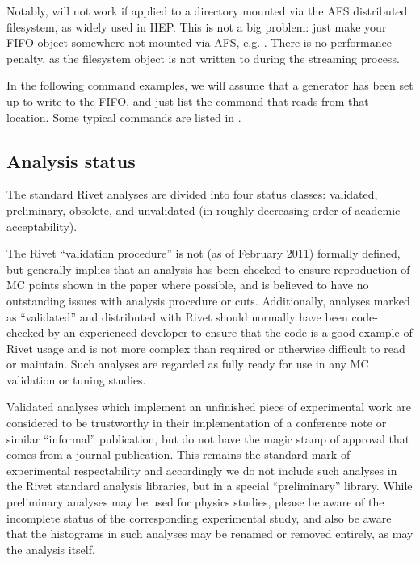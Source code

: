 \documentclass{JHEP3}
\begin{document}
Notably,  will not work if applied to a directory mounted via the
AFS distributed filesystem, as widely used in HEP. This is not a big problem:
just make your FIFO object somewhere not mounted via AFS, e.g. . There
is no performance penalty, as the filesystem object is not written to during the
streaming process.

In the following command examples, we will assume that a generator has been set
up to write to the  FIFO, and just list the  command
that reads from that location. Some typical  commands are
listed in .


\subsection{Analysis status}

The standard Rivet analyses are divided into four status classes: validated,
preliminary, obsolete, and unvalidated (in roughly decreasing order of academic
acceptability).

The Rivet ``validation procedure'' is not (as of February 2011) formally
defined, but generally implies that an analysis has been checked to ensure
reproduction of MC points shown in the paper where possible, and is believed to
have no outstanding issues with analysis procedure or cuts.  Additionally,
analyses marked as ``validated'' and distributed with Rivet should normally have
been code-checked by an experienced developer to ensure that the code is a good
example of Rivet usage and is not more complex than required or otherwise
difficult to read or maintain. Such analyses are regarded as fully ready for use
in any MC validation or tuning studies.

Validated analyses which implement an unfinished piece of experimental work are
considered to be trustworthy in their implementation of a conference note or
similar ``informal'' publication, but do not have the magic stamp of approval
that comes from a journal publication. This remains the standard mark of
experimental respectability and accordingly we do not include such analyses in
the Rivet standard analysis libraries, but in a special ``preliminary''
library. While preliminary analyses may be used for physics studies, please be
aware of the incomplete status of the corresponding experimental study, and also
be aware that the histograms in such analyses may be renamed or removed
entirely, as may the analysis itself.
\end{document}
